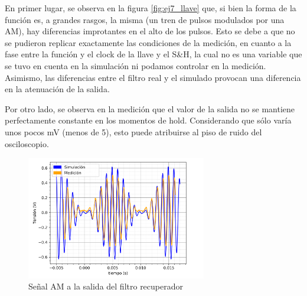 \documentclass[a4paper]{article}
\begin{document}
En primer lugar, se observa en la figura \ref{fig:ej7_llave} que, si bien la forma de la funci\'on es, a grandes rasgos, la misma (un tren de pulsos modulados por una AM), hay diferencias improtantes en el alto de los pulsos. Esto se debe a que no se pudieron replicar exactamente las condiciones de la medici\'on, en cuanto a la fase entre la funci\'on y el clock de la llave y el S\&H, la cual no es una variable que se tuvo en cuenta en la simulaci\'on ni podamos controlar en la medici\'on. Asimismo, las diferencias entre el filtro real y el simulado provocan una diferencia en la atenuaci\'on de la salida. 

Por otro lado, se observa en la medici\'on que el valor de la salida no se mantiene perfectamente constante en los momentos de hold. Considerando que s\'olo var\'ia unos pocos mV (menos de 5), esto puede atribuirse al piso de ruido del osciloscopio.

\begin{figure}[htp]
	\centering
	\includegraphics[width=0.7\textwidth]{ej7_meds/med_20.png}
	\caption{Se\~nal AM a la salida del filtro recuperador}
	\label{fig:ej7_out}
\end{figure}
\end{document}
